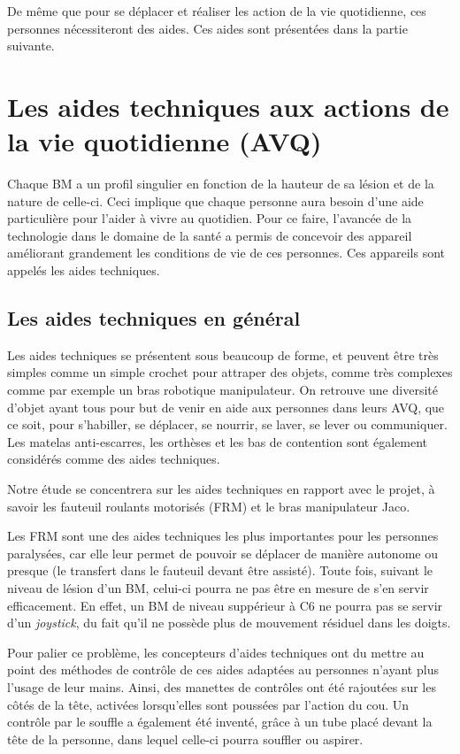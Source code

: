\documentclass[letterpaper, twoside, 12pt, memoire, creativecommons, hyperref]{thETS}
\begin{document}
De même que pour se déplacer et réaliser les action de la vie quotidienne, ces personnes nécessiteront des aides. Ces aides sont présentées dans la partie suivante.

\section{Les aides techniques aux actions de la vie quotidienne (AVQ)}

Chaque BM a un profil singulier en fonction de la hauteur de sa lésion et de la nature de celle-ci. Ceci implique que chaque personne aura besoin d'une aide particulière pour l'aider à vivre au quotidien. Pour ce faire,  l'avancée de la technologie dans le domaine de la santé a permis de concevoir des appareil améliorant grandement les conditions de vie de ces personnes. Ces appareils sont appelés les aides techniques. 

\subsection{Les aides techniques en général}

Les aides techniques se présentent sous beaucoup de forme, et peuvent être très simples comme un simple crochet pour attraper des objets, comme très complexes comme par exemple un bras robotique manipulateur. On retrouve une diversité d'objet ayant tous pour but de venir en aide aux personnes dans leurs AVQ, que ce soit, pour s'habiller, se déplacer, se nourrir, se laver, se lever ou communiquer. Les matelas anti-escarres, les orthèses et les bas de contention sont également considérés comme des aides techniques.

Notre étude se concentrera sur les aides techniques en rapport avec le projet, à savoir les fauteuil roulants motorisés (FRM) et le bras manipulateur Jaco.

Les FRM sont une des aides techniques les plus importantes pour les personnes paralysées, car elle leur permet de pouvoir se déplacer de manière autonome ou presque (le transfert dans le fauteuil devant être assisté). Toute fois, suivant le niveau de lésion d'un BM, celui-ci pourra ne pas être en mesure de s'en servir efficacement. En effet, un BM de niveau suppérieur à C6 ne pourra pas se servir d'un \textit{joystick}, du fait qu'il ne possède plus de mouvement résiduel dans les doigts. 

Pour palier ce problème, les concepteurs d'aides techniques ont du mettre au point des méthodes de contrôle de ces aides adaptées au personnes n'ayant plus l'usage de leur mains. Ainsi, des manettes de contrôles ont été rajoutées sur les côtés de la tête, activées lorsqu'elles sont poussées par l'action du cou. Un contrôle par le souffle a également été inventé, grâce à un tube placé devant la tête de la personne, dans lequel celle-ci pourra souffler ou aspirer.
\end{document}
